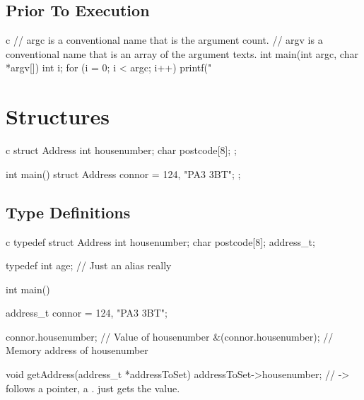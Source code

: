 \subsection{Prior To Execution}\label{sub:prior_to_execution}

\begin{code}{c}
    // argc is a conventional name that is the argument count.
    // argv is a conventional name that is an array of the argument texts.
    int main(int argc, char *argv[]) {
        int i;
        for (i = 0; i < argc; i++) {
            printf("%
        }
    }
\end{code}

\section{Structures}\label{sec:c_structures}

\begin{code}{c}
    struct Address {
        int housenumber;
        char postcode[8];
    };

    int main() {
        struct Address connor = {124, "PA3 3BT"};
    };
\end{code}

\subsection{Type Definitions}\label{sub:type_definitions}

\begin{code}{c}
    typedef struct Address {
        int housenumber;
        char postcode[8];
    } address_t;

    typedef int age; // Just an alias really

    int main() {
        address_t connor = {124, "PA3 3BT"};

        connor.housenumber; // Value of housenumber
        &(connor.housenumber); // Memory address of housenumber
    }

    void getAddress(address_t *addressToSet) {
        addressToSet->housenumber; // -> follows a pointer, a . just gets the value.
    }
\end{code}
